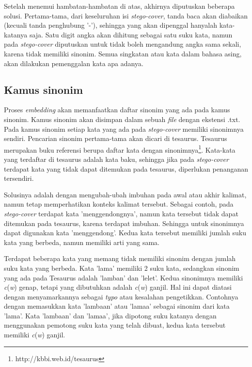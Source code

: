 Setelah menemui hambatan-hambatan di atas, akhirnya diputuskan beberapa solusi. Pertama-tama, dari keseluruhan isi \textit{stego-cover}, tanda baca akan diabaikan (kecuali tanda penghubung '-'), sehingga yang akan dipenggal hanyalah kata-katanya saja. Satu digit angka akan dihitung sebagai satu suku kata, namun pada \textit{stego-cover} diputuskan untuk tidak boleh mengandung angka sama sekali, karena tidak memiliki sinonim. Semua singkatan atau kata dalam bahasa asing, akan dilakukan pemenggalan kata apa adanya.

\subsection{Kamus sinonim}
\label{sec:kamus_sinonim}
Proses \textit{embedding} akan memanfaatkan daftar sinonim yang ada pada kamus sinonim. Kamus sinonim akan disimpan dalam sebuah \textit{file} dengan ekstensi .txt. Pada kamus sinonim setiap kata yang ada pada \textit{stego-cover} memiliki sinonimnya sendiri. Pencarian sinonim pertama-tama akan dicari di tesaurus. Tesaurus merupakan buku referensi berupa daftar kata dengan sinonimnya\footnote{http://kbbi.web.id/tesaurus}. Kata-kata yang terdaftar di tesaurus adalah kata baku, sehingga jika pada \textit{stego-cover} terdapat kata yang tidak dapat ditemukan pada tesaurus, diperlukan penanganan tersendiri.

Solusinya adalah dengan mengubah-ubah imbuhan pada awal atau akhir kalimat, namun tetap memperhatikan konteks kalimat tersebut. Sebagai contoh, pada \textit{stego-cover} terdapat kata 'menggendongnya', namun kata tersebut tidak dapat ditemukan pada tesaurus, karena terdapat imbuhan. Sehingga untuk sinonimnya dapat digunakan kata 'menggendong'. Kedua kata tersebut memiliki jumlah suku kata yang berbeda, namun memiliki arti yang sama.

Terdapat beberapa kata yang memang tidak memiliki sinonim dengan jumlah suku kata yang berbeda. Kata 'lama' memiliki 2 suku kata, sedangkan sinonim yang ada pada Tesaurus adalah 'lamban' dan 'lelet'. Kedua sinonimnya memiliki \textit{c}(\textit{w}) genap, tetapi yang dibutuhkan adalah \textit{c}(\textit{w}) ganjil. Hal ini dapat diatasi dengan menyamarkannya sebagai \textit{typo} atau kesalahan pengetikkan. Contohnya dengan memasukkan kata 'lambaan' atau 'lamaa' sebagai sinonim dari kata 'lama'. Kata 'lambaan' dan 'lamaa', jika dipotong suku katanya dengan menggunakan pemotong suku kata yang telah dibuat, kedua kata tersebut memiliki \textit{c}(\textit{w}) ganjil.

